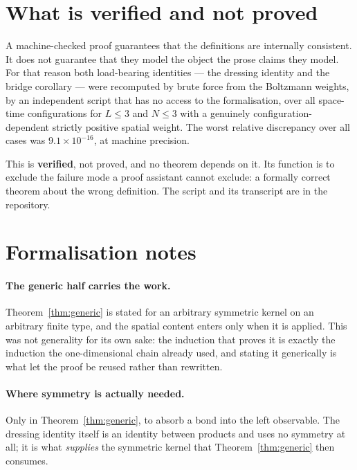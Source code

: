 \documentclass[11pt]{article}
\theoremstyle{definition}
\begin{document}
\section{What is verified and not proved}\label{sec:verified}

A machine-checked proof guarantees that the definitions are internally
consistent.  It does not guarantee that they model the object the prose claims
they model.  For that reason both load-bearing identities --- the dressing
identity and the bridge corollary --- were recomputed by brute force from the
Boltzmann weights, by an independent script that has no access to the
formalisation, over all space-time configurations for $L\le3$ and $N\le3$ with
a genuinely configuration-dependent strictly positive spatial weight.  The
worst relative discrepancy over all cases was $9.1\times10^{-16}$, at machine
precision.

This is \textbf{verified}, not proved, and no theorem depends on it.  Its
function is to exclude the failure mode a proof assistant cannot exclude: a
formally correct theorem about the wrong definition.  The script and its
transcript are in the repository.

\section{Formalisation notes}\label{sec:formal}

\paragraph{The generic half carries the work.}  Theorem~\ref{thm:generic} is
stated for an arbitrary symmetric kernel on an arbitrary finite type, and the
spatial content enters only when it is applied.  This was not generality for
its own sake: the induction that proves it is exactly the induction the
one-dimensional chain already used, and stating it generically is what let the
proof be reused rather than rewritten.

\paragraph{Where symmetry is actually needed.}  Only in
Theorem~\ref{thm:generic}, to absorb a bond into the left observable.  The
dressing identity itself is an identity between products and uses no symmetry
at all; it is what \emph{supplies} the symmetric kernel that
Theorem~\ref{thm:generic} then consumes.
\end{document}
